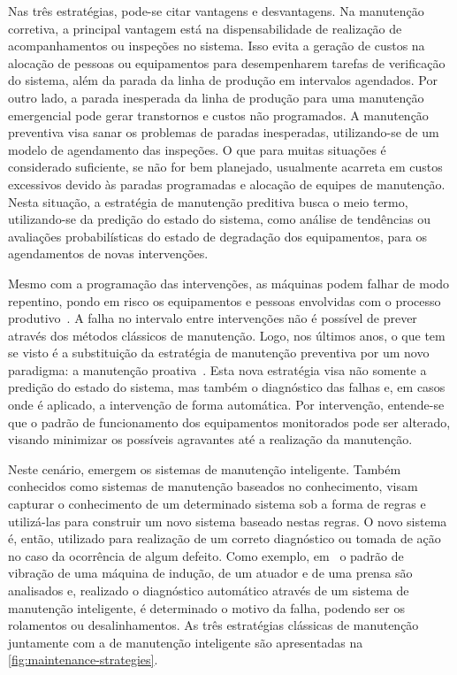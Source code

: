 Nas três estratégias, pode-se citar vantagens e desvantagens. Na manutenção corretiva, a principal
vantagem está na dispensabilidade de realização de acompanhamentos ou inspeções no sistema. Isso
evita a geração de custos na alocação de pessoas ou equipamentos para desempenharem tarefas de
verificação do sistema, além da parada da linha de produção em intervalos agendados. Por outro lado,
a parada inesperada da linha de produção para uma manutenção emergencial pode gerar transtornos e
custos não programados. A manutenção preventiva visa sanar os problemas de paradas inesperadas,
utilizando-se de um modelo de agendamento das inspeções. O que para muitas situações é considerado
suficiente, se não for bem planejado, usualmente acarreta em custos excessivos devido às paradas
programadas e alocação de equipes de manutenção. Nesta situação, a estratégia de manutenção
preditiva busca o meio termo, utilizando-se da predição do estado do sistema, como análise de
tendências ou avaliações probabilísticas do estado de degradação dos equipamentos, para os
agendamentos de novas intervenções.

Mesmo com a programação das intervenções, as máquinas podem falhar de modo repentino, pondo em risco
os equipamentos e pessoas envolvidas com o processo produtivo~\cite{goncalves2011desenvolvimento}. A
falha no intervalo entre intervenções não é possível de prever através dos métodos clássicos de
manutenção. Logo, nos últimos anos, o que tem se visto é a substituição da estratégia de manutenção
preventiva por um novo paradigma: a manutenção proativa~\cite{lee2009informatics}. Esta nova
estratégia visa não somente a predição do estado do sistema, mas também o diagnóstico das falhas e,
em casos onde é aplicado, a intervenção de forma automática. Por intervenção, entende-se que o
padrão de funcionamento dos equipamentos monitorados pode ser alterado, visando minimizar os
possíveis agravantes até a realização da manutenção.

Neste cenário, emergem os sistemas de manutenção inteligente. Também conhecidos como sistemas de
manutenção baseados no conhecimento, visam capturar o conhecimento de um determinado sistema sob a
forma de regras e utilizá-las para construir um novo sistema baseado nestas regras. O novo sistema
é, então, utilizado para realização de um correto diagnóstico ou tomada de ação no caso da
ocorrência de algum defeito. Como exemplo, em~\cite{shikari2004automation} o padrão de vibração de
uma máquina de indução, de um atuador e de uma prensa são analisados e, realizado o diagnóstico
automático através de um sistema de manutenção inteligente, é determinado o motivo da falha, podendo
ser os rolamentos ou desalinhamentos. As três estratégias clássicas de manutenção juntamente com a
de manutenção inteligente são apresentadas na \cref{fig:maintenance-strategies}.

